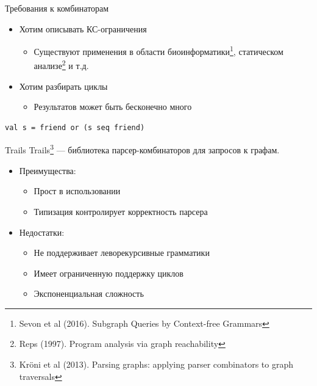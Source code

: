 \documentclass[aspectratio=169]{beamer}
\begin{document}
\begin{frame}[fragile]{Требования к комбинаторам}
  \begin{itemize}
    \item Хотим описывать КС-ограничения
          \begin{itemize}
            \item Существуют применения в области биоинформатики\footnote{Sevon et al (2016). Subgraph Queries by Context-free Grammars}, статическом анализе\footnote{Reps (1997). Program analysis via graph reachability} и т.д.
          \end{itemize}
    \item Хотим разбирать циклы
          \begin{itemize}
            \item Результатов может быть бесконечно много
          \end{itemize}
  \end{itemize}
  \begin{verbatim}
val s = friend or (s seq friend)
\end{verbatim}
\end{frame}


\begin{frame}{Trails}
  Trails\footnote{Kr\"{o}ni et al (2013). Parsing graphs: applying parser combinators to graph traversals} --- библиотека парсер-комбинаторов для запросов к графам.
  \begin{itemize}
    \item Преимущества:
          \begin{itemize}
            \item Прост в использовании
            \item Типизация контролирует корректность парсера
          \end{itemize}
          \vspace{0.5cm}
    \item Недостатки:
          \begin{itemize}
            \item Не поддерживает леворекурсивные грамматики
            \item Имеет ограниченную поддержку циклов
            \item Экспоненциальная сложность
          \end{itemize}
  \end{itemize}
\end{frame}
\end{document}
